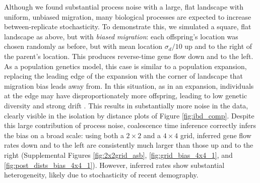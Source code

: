 \documentclass{article}
\begin{document}
Although we found substantial process noise
with a large, flat landscape with uniform, unbiased migration,
many biological processes are expected to increase between-replicate stochasticity.
To demonstrate this, we simulated a square, flat landscape as above,
but with \emph{biased migration}: 
each offspring's location was chosen randomly as before,
but with mean location $\sigma_d/10$
up and to the right of the parent's location.
This produces reverse-time gene flow down and to the left.
As a population genetics model,
this case is similar to a population expansion,
replacing the leading edge of the expansion with the corner of landscape 
that migration bias leads away from.
In this situation, as in an expansion, 
individuals at the edge may have disproportionately more offspring,
leading to low genetic diversity and strong drift \citep{surfing}.
This results in substantially more noise in the data,
clearly visible in the isolation by distance plots of Figure \ref{fig:ibd_comp}. 
Despite this large contribution of process noise,
coalescence time inference correctly infers the bias on a broad scale:
using both a $2 \times 2$ and a $4 \times 4$ grid,
inferred gene flow rates down and to the left are consistently much larger
than those up and to the right 
(Supplemental Figures \ref{fig:2x2grid_asb}, \ref{fig:grid_bias_4x4_1}, 
and \ref{fig:post_dists_bias_4x4_1}).
However, inferred rates show substantial heterogeneity,
likely due to stochasticity of recent demography.
\end{document}
